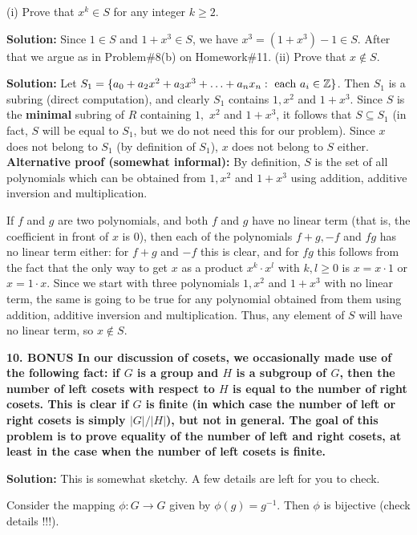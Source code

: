 \documentclass[12pt]{article}
\begin{document}
\sk (i) Prove that $x^k\in S$ for any integer $k\geq 2$.

{\bf Solution: } Since $1\in S$ and $1+x^3\in S$, we have
$x^3=(1+x^3)-1\in S$. After that we argue as in Problem\#8(b) on Homework\#11.
\skv
\sk (ii) Prove that $x\not \in S$.

{\bf Solution: } Let $S_1=\{a_0+a_2 x^2+ a_3 x^3+\ldots + a_n x_n : \mbox{ each }a_i\in{\mathbb Z}\}$.
Then $S_1$ is a subring (direct computation), and clearly $S_1$ contains $1, x^2$ and $1+x^3$.
Since $S$ is the {\bf minimal } subring of $R$ containing $1,\,\, x^2$ and $1+x^3$, it follows that
$S\subseteq S_1$ (in fact, $S$ will be equal to $S_1$, but we do not need this
for our problem). Since $x$ does not belong to $S_1$ (by definition of $S_1$),
$x$ does not belong to $S$ either.
\skv
{\bf Alternative proof (somewhat informal): } By definition, $S$ is the set of all polynomials
which can be obtained from $1, x^2$ and $1+x^3$ using addition, additive inversion and multiplication.

If $f$ and $g$ are two polynomials, and both $f$ and $g$ have no linear term (that is,
the coefficient in front of $x$ is $0$), then each of the polynomials $f+g, -f$ and $fg$
has no linear term either: for $f+g$ and $-f$ this is clear, and for $fg$ this follows from
the fact that the only way to get $x$ as a product $x^k\cdot x^l$ with $k,l\geq 0$
is $x=x\cdot 1$ or $x=1\cdot x$. Since we start with three polynomials $1, x^2$ and $1+x^3$
with no linear term, the same is going to be true for any polynomial obtained from them
using addition, additive inversion and multiplication. Thus, any element of $S$
will have no linear term, so $x\not\in S$.
\skv
\skv

\bf{10. }\rm BONUS In our discussion of cosets, we occasionally
made use of the following fact: if $G$ is a group and $H$ is a subgroup of $G$,
then the number of left cosets with respect to $H$ is equal to
the number of right cosets. This is clear if $G$ is finite (in which case
the number of left or right cosets is simply $|G|/|H|$), but not in general.
The goal of this problem is to prove equality of the number of left and right
cosets, at least in the case when the number of left cosets is finite.
\skv

{\bf Solution: } This is somewhat sketchy. A few details are left for you
to check.

Consider the mapping $\phi:G\to G$ given by $\phi(g)=g^{-1}$.
Then $\phi$ is bijective (check details !!!).
\end{document}
